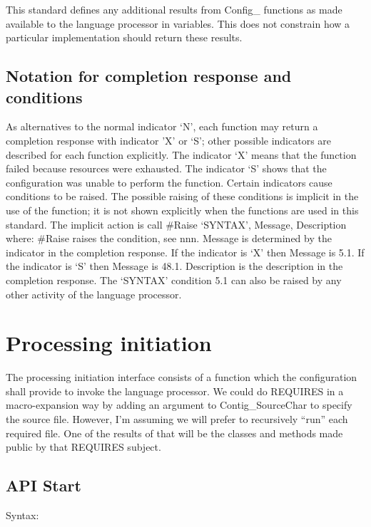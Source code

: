 This standard defines any additional results from Config\_ functions as
made available to the language processor in variables. This does not
constrain how a particular implementation should return these results.

\subsection{Notation for completion response and
conditions}\label{notation-for-completion-response-and-conditions}

As alternatives to the normal indicator `N', each function may return a
completion response with indicator 'X' or `S'; other possible indicators
are described for each function explicitly. The indicator `X' means that
the function failed because resources were exhausted. The indicator `S'
shows that the configuration was unable to perform the function. Certain
indicators cause conditions to be raised. The possible raising of these
conditions is implicit in the use of the function; it is not shown
explicitly when the functions are used in this standard. The implicit
action is call \#Raise `SYNTAX', Message, Description where: \#Raise
raises the condition, see nnn. Message is determined by the indicator in
the completion response. If the indicator is `X' then Message is 5.1. If
the indicator is `S' then Message is 48.1. Description is the
description in the completion response. The `SYNTAX' condition 5.1 can
also be raised by any other activity of the language processor.

\section{Processing initiation}\label{processing-initiation}

The processing initiation interface consists of a function which the
configuration shall provide to invoke the language processor. We could
do REQUIRES in a macro-expansion way by adding an argument to
Contig\_SourceChar to specify the source file. However, I'm assuming we
will prefer to recursively ``run'' each required file. One of the
results of that will be the classes and methods made public by that
REQUIRES subject.

\subsection{API Start}\label{api-start}

Syntax:

